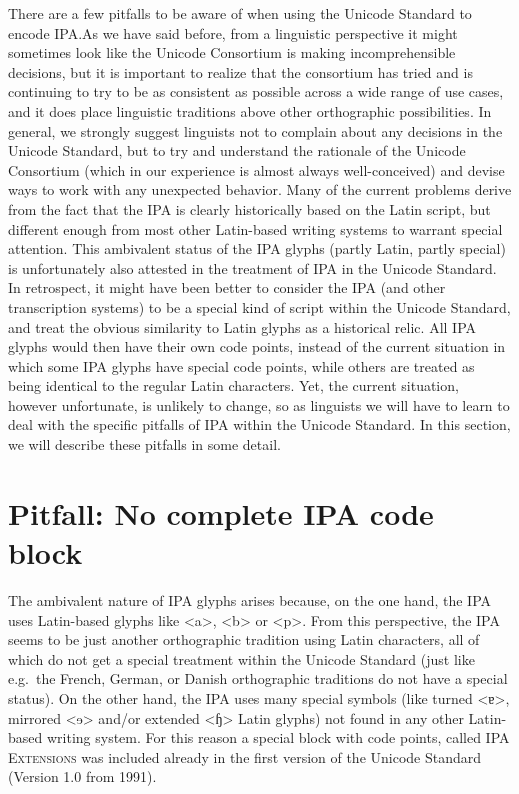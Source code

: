 There are a few pitfalls to be aware of when using the Unicode Standard to
encode IPA.\@ As we have said before, from a linguistic perspective it might
sometimes look like the Unicode Consortium is making incomprehensible decisions,
but it is important to realize that the consortium has tried and is continuing
to try to be as consistent as possible across a wide range of use cases, and it
does place linguistic traditions above other orthographic possibilities. In
general, we strongly suggest linguists not to complain about any decisions in
the Unicode Standard, but to try and understand the rationale of the Unicode
Consortium (which in our experience is almost always well-conceived) and devise
ways to work with any unexpected behavior. Many of the current problems derive
from the fact that the IPA is clearly historically based on the Latin script,
but different enough from most other Latin-based writing systems to warrant
special attention. This ambivalent status of the IPA glyphs (partly Latin,
partly special) is unfortunately also attested in the treatment of IPA in the
Unicode Standard. In retrospect, it might have been better to consider the IPA
(and other transcription systems) to be a special kind of script within
the Unicode Standard, and treat the obvious similarity to Latin glyphs as a
historical relic. All IPA glyphs would then have their own code points, instead
of the current situation in which some IPA glyphs have special code points,
while others are treated as being identical to the regular Latin characters.
Yet, the current situation, however unfortunate, is unlikely to change, so as
linguists we will have to learn to deal with the specific pitfalls of IPA within
the Unicode Standard. In this section, we will describe these pitfalls in some
detail.

\section{Pitfall: No complete IPA code block}
\label{pitfall-no-complete-ipa-block}

The ambivalent nature of IPA glyphs arises because, on the one hand, the IPA
uses Latin-based glyphs like <a>, <b> or <p>. From this perspective, the IPA
seems to be just another orthographic tradition using Latin characters, all of
which do not get a special treatment within the Unicode Standard (just like
e.g.~the French, German, or Danish orthographic traditions do not have a special
status). On the other hand, the IPA uses many special symbols (like turned <ɐ>,
mirrored <ɘ> and/or extended <ɧ> Latin glyphs) not found in any other Latin-based
writing system. For this reason a special block with code points, called
\textsc{IPA Extensions} was included already in the first version of the Unicode
Standard (Version 1.0 from 1991).

